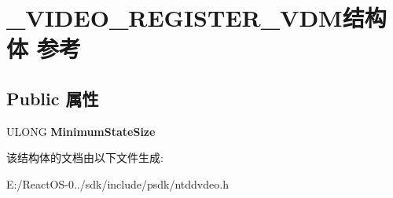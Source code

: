 \hypertarget{struct___v_i_d_e_o___r_e_g_i_s_t_e_r___v_d_m}{}\section{\+\_\+\+V\+I\+D\+E\+O\+\_\+\+R\+E\+G\+I\+S\+T\+E\+R\+\_\+\+V\+D\+M结构体 参考}
\label{struct___v_i_d_e_o___r_e_g_i_s_t_e_r___v_d_m}
\subsection*{Public 属性}
\begin{DoxyCompactItemize}
\item 
\mbox{\label{struct___v_i_d_e_o___r_e_g_i_s_t_e_r___v_d_m_ada6476b83f905795ba2486a2500aa72a}} 
U\+L\+O\+NG {\bfseries Minimum\+State\+Size}
\end{DoxyCompactItemize}


该结构体的文档由以下文件生成\+:\begin{DoxyCompactItemize}
\item 
E\+:/\+React\+O\+S-\/0../sdk/include/psdk/ntddvdeo.\+h\end{DoxyCompactItemize}
